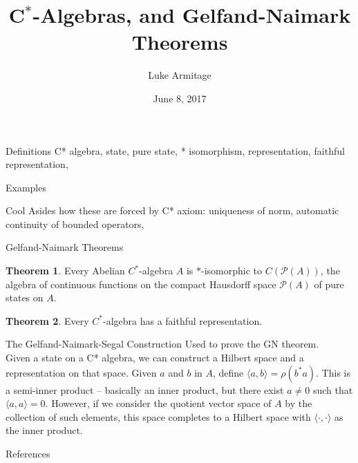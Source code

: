 \documentclass[11pt]{beamer}
\author{Luke Armitage}
\title{C$^\ast$-Algebras, and Gelfand-Naimark Theorems}
\institute{University of York}
\date{June 8, 2017}
\theoremstyle{definition}
\theoremstyle{theorem}
\newtheorem{thm}{Theorem}
\renewcommand{\P}[1]{\mathscr{P}(#1)}
\begin{document}
\begin{frame}
\titlepage
\end{frame}

\begin{frame} {Definitions}
	C* algebra, %
	state, pure state,
	* isomorphism,
	representation, faithful representation,
\end{frame}

\begin{frame} {Examples}
	
\end{frame}

\begin{frame} {Cool Asides}
	how these are forced by C* axiom:
	uniqueness of norm,
	automatic continuity of bounded operators,
\end{frame}

\begin{frame} {Gelfand-Naimark Theorems}
	\begin{thm}
		Every Abelian $C^\ast$-algebra $A$ is $\ast$-isomorphic to $C(\P A)$, the 
		algebra of continuous functions on the compact Hausdorff space $\P A$ of pure 
		states on $A$.
	\end{thm}
	\pause
	\begin{thm}
		Every $C^\ast$-algebra has a faithful representation.
	\end{thm}
\end{frame}

\begin{frame} {The Gelfand-Naimark-Segal Construction}
	Used to prove the GN theorem. \\
	Given a state on a C* algebra, we can construct a Hilbert space and a representation on that space.
	Given $a$ and $b$ in $A$, define $\langle a, b \rangle = \rho(b^\ast a)$. This is a semi-inner product -- basically an inner product, but there exist $a \neq 0$ such that $\langle a,a \rangle = 0$.
	However, if we consider the quotient vector space of $A$ by the collection of such elements, this space completes to a Hilbert space with $\langle \cdot , \cdot \rangle$ as the inner product.
\end{frame}

\begin{frame} {References}
	
\end{frame}
\end{document}
